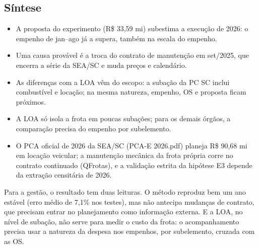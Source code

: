 \subsection{Síntese}
\begin{itemize}
\item A proposta do experimento (R\$ 33,59 mi) subestima a execução de 2026: o empenho de jan--ago já a supera, também na escala do empenho.
\item Uma causa provável é a troca do contrato de manutenção em set/2025, que encerra a série da SEA/SC e muda preços e calendário.
\item As diferenças com a LOA vêm do escopo: a subação da PC SC inclui combustível e locação; na mesma natureza, empenho, OS e proposta ficam próximos.
\item A LOA só isola a frota em poucas subações; para os demais órgãos, a comparação precisa do empenho por subelemento.
\item O PCA oficial de 2026 da SEA/SC (PCA-E 2026.pdf) planeja R\$ 90,68 mi em locação veicular; a manutenção mecânica da frota própria corre no contrato continuado (QFrotas), e a validação estrita da hipótese E3 depende da extração censitária de 2026.
\end{itemize}
Para a gestão, o resultado tem duas leituras. O método reproduz bem um ano estável (erro médio de 7,1\% nos testes), mas não antecipa mudanças de contrato, que precisam entrar no planejamento como informação externa. E a LOA, no nível de subação, não serve para medir o custo da frota: o acompanhamento precisa usar a natureza da despesa nos empenhos, por subelemento, cruzada com as OS.
